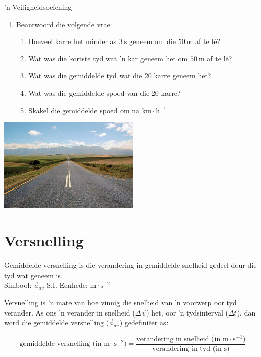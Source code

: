 \begin{Investigation}{'n Veiligheidsoefening}
\begin{enumerate}[noitemsep, label=\textbf{\arabic*}. ]
\item Beantwoord die volgende vrae:
\begin{enumerate}[noitemsep, label=\textbf{\alph*}. ] 
    \item Hoeveel karre het minder as $3~\text{s}$ geneem om die $50~\text{m}$ af te l\^e?
    \item Wat was die kortste tyd wat 'n kar geneem het om $50~\text{m}$ af te l\^e?
    \item Wat was die gemiddelde tyd wat die 20 karre geneem het?
    \item Wat was die gemiddelde spoed van die 20 karre?
    \item Skakel die gemiddelde spoed om na $\text{km}\ensuremath{\cdot}\text{h}{}^{-1}$.
\end{enumerate}
        \end{enumerate}
\begin{center}
\includegraphics[width=0.5\textwidth]{photos/roadby_cornstaruk_flickr.jpg}
\end{center}
\end{Investigation}



\section{Versnelling}
 {Gemiddelde versnelling is die verandering in gemiddelde snelheid gedeel deur die tyd wat geneem is.\\
Simbool: $\vec{a}_{av}$\hspace{2cm} S.I. Eenhede: $\text{m} \cdot \text{s}^{-2}$ } 

Versnelling is 'n mate van hoe vinnig  die snelheid van 'n voorwerp oor tyd verander. As ons 'n verander in snelheid ($\Delta \vec{v}$) het, oor 'n tydsinterval ($\Delta t$), dan word die gemiddelde versnelling ($\vec{a}_{av}$) gedefini\"eer as:

\begin{equation*}
    \text{gemiddelde versnelling (in m} \cdot {\text{s}}^{-2}\text{)} =\frac{\text{verandering in snelheid (in m} \cdot {\text{s}}^{-1}\text{)}}{\text{verandering in tyd (in s)}}
      \end{equation*}
        
